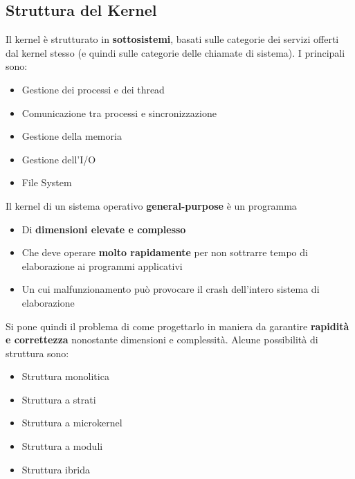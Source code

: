 \documentclass[12pt]{article}
\begin{document}
\subsection{Struttura del Kernel}
Il kernel è strutturato in \textbf{sottosistemi}, basati sulle categorie dei servizi offerti dal kernel stesso (e quindi sulle categorie delle chiamate di sistema).
I principali sono:
\begin{itemize}
    \item Gestione dei processi e dei thread
    \item Comunicazione tra processi e sincronizzazione
    \item Gestione della memoria
    \item Gestione dell'I/O
    \item File System
\end{itemize}
Il kernel di un sistema operativo \textbf{general-purpose} è un programma
\begin{itemize}
    \item Di \textbf{dimensioni elevate e complesso}
    \item Che deve operare \textbf{molto rapidamente} per non sottrarre tempo di elaborazione ai programmi applicativi
    \item Un cui malfunzionamento può provocare il crash dell'intero sistema di elaborazione
\end{itemize}
Si pone quindi il problema di come progettarlo in maniera da garantire \textbf{rapidità e correttezza} nonostante dimensioni e complessità.
Alcune possibilità di struttura sono:
\begin{itemize}
    \item Struttura monolitica
    \item Struttura a strati
    \item Struttura a microkernel
    \item Struttura a moduli
    \item Struttura ibrida
\end{itemize}
\end{document}
